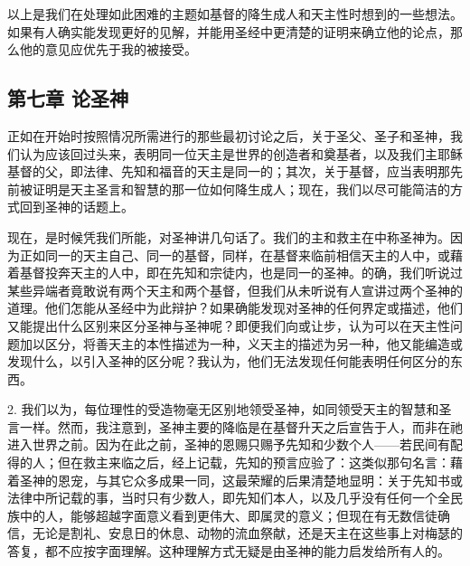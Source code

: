 以上是我们在处理如此困难的主题如基督的降生成人和天主性时想到的一些想法。如果有人确实能发现更好的见解，并能用圣经中更清楚的证明来确立他的论点，那么他的意见应优先于我的被接受。\par


\subsection{第七章 论圣神}

正如在开始时按照情况所需进行的那些最初讨论之后，关于圣父、圣子和圣神，我们认为应该回过头来，表明同一位天主是世界的创造者和奠基者，以及我们主耶稣基督的父，即法律、先知和福音的天主是同一的；其次，关于基督，应当表明那先前被证明是天主圣言和智慧的那一位如何降生成人；现在，我们以尽可能简洁的方式回到圣神的话题上。\par

现在，是时候凭我们所能，对圣神讲几句话了。我们的主和救主在中称圣神为。因为正如同一的天主自己、同一的基督，同样，在基督来临前相信天主的人中，或藉着基督投奔天主的人中，即在先知和宗徒内，也是同一的圣神。的确，我们听说过某些异端者竟敢说有两个天主和两个基督，但我们从未听说有人宣讲过两个圣神的道理。他们怎能从圣经中为此辩护？如果确能发现对圣神的任何界定或描述，他们又能提出什么区别来区分圣神与圣神呢？即便我们向或让步，认为可以在天主性问题加以区分，将善天主的本性描述为一种，义天主的描述为另一种，他又能编造或发现什么，以引入圣神的区分呢？我认为，他们无法发现任何能表明任何区分的东西。\par

2. 我们以为，每位理性的受造物毫无区别地领受圣神，如同领受天主的智慧和圣言一样。然而，我注意到，圣神主要的降临是在基督升天之后宣告于人，而非在祂进入世界之前。因为在此之前，圣神的恩赐只赐予先知和少数个人——若民间有配得的人；但在救主来临之后，经上记载，先知的预言应验了：这类似那句名言：藉着圣神的恩宠，与其它众多成果一同，这最荣耀的后果清楚地显明：关于先知书或法律中所记载的事，当时只有少数人，即先知们本人，以及几乎没有任何一个全民族中的人，能够超越字面意义看到更伟大、即属灵的意义；但现在有无数信徒确信，无论是割礼、安息日的休息、动物的流血祭献，还是天主在这些事上对梅瑟的答复，都不应按字面理解。这种理解方式无疑是由圣神的能力启发给所有人的。\par

